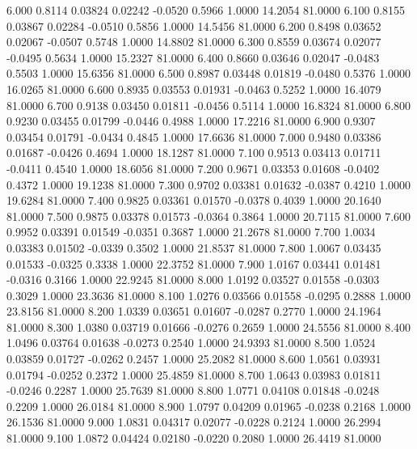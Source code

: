    6.000   0.8114   0.03824   0.02242  -0.0520   0.5966   1.0000  14.2054  81.0000
   6.100   0.8155   0.03867   0.02284  -0.0510   0.5856   1.0000  14.5456  81.0000
   6.200   0.8498   0.03652   0.02067  -0.0507   0.5748   1.0000  14.8802  81.0000
   6.300   0.8559   0.03674   0.02077  -0.0495   0.5634   1.0000  15.2327  81.0000
   6.400   0.8660   0.03646   0.02047  -0.0483   0.5503   1.0000  15.6356  81.0000
   6.500   0.8987   0.03448   0.01819  -0.0480   0.5376   1.0000  16.0265  81.0000
   6.600   0.8935   0.03553   0.01931  -0.0463   0.5252   1.0000  16.4079  81.0000
   6.700   0.9138   0.03450   0.01811  -0.0456   0.5114   1.0000  16.8324  81.0000
   6.800   0.9230   0.03455   0.01799  -0.0446   0.4988   1.0000  17.2216  81.0000
   6.900   0.9307   0.03454   0.01791  -0.0434   0.4845   1.0000  17.6636  81.0000
   7.000   0.9480   0.03386   0.01687  -0.0426   0.4694   1.0000  18.1287  81.0000
   7.100   0.9513   0.03413   0.01711  -0.0411   0.4540   1.0000  18.6056  81.0000
   7.200   0.9671   0.03353   0.01608  -0.0402   0.4372   1.0000  19.1238  81.0000
   7.300   0.9702   0.03381   0.01632  -0.0387   0.4210   1.0000  19.6284  81.0000
   7.400   0.9825   0.03361   0.01570  -0.0378   0.4039   1.0000  20.1640  81.0000
   7.500   0.9875   0.03378   0.01573  -0.0364   0.3864   1.0000  20.7115  81.0000
   7.600   0.9952   0.03391   0.01549  -0.0351   0.3687   1.0000  21.2678  81.0000
   7.700   1.0034   0.03383   0.01502  -0.0339   0.3502   1.0000  21.8537  81.0000
   7.800   1.0067   0.03435   0.01533  -0.0325   0.3338   1.0000  22.3752  81.0000
   7.900   1.0167   0.03441   0.01481  -0.0316   0.3166   1.0000  22.9245  81.0000
   8.000   1.0192   0.03527   0.01558  -0.0303   0.3029   1.0000  23.3636  81.0000
   8.100   1.0276   0.03566   0.01558  -0.0295   0.2888   1.0000  23.8156  81.0000
   8.200   1.0339   0.03651   0.01607  -0.0287   0.2770   1.0000  24.1964  81.0000
   8.300   1.0380   0.03719   0.01666  -0.0276   0.2659   1.0000  24.5556  81.0000
   8.400   1.0496   0.03764   0.01638  -0.0273   0.2540   1.0000  24.9393  81.0000
   8.500   1.0524   0.03859   0.01727  -0.0262   0.2457   1.0000  25.2082  81.0000
   8.600   1.0561   0.03931   0.01794  -0.0252   0.2372   1.0000  25.4859  81.0000
   8.700   1.0643   0.03983   0.01811  -0.0246   0.2287   1.0000  25.7639  81.0000
   8.800   1.0771   0.04108   0.01848  -0.0248   0.2209   1.0000  26.0184  81.0000
   8.900   1.0797   0.04209   0.01965  -0.0238   0.2168   1.0000  26.1536  81.0000
   9.000   1.0831   0.04317   0.02077  -0.0228   0.2124   1.0000  26.2994  81.0000
   9.100   1.0872   0.04424   0.02180  -0.0220   0.2080   1.0000  26.4419  81.0000
